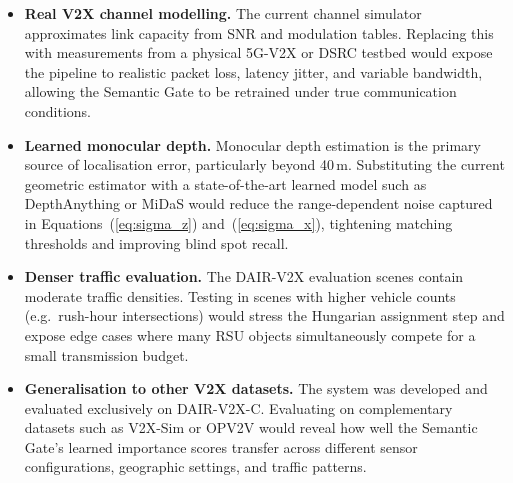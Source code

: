 \documentclass[12pt]{article}
\begin{document}
\begin{itemize}
    \item \textbf{Real V2X channel modelling.}  The current channel
    simulator approximates link capacity from SNR and modulation tables.
    Replacing this with measurements from a physical 5G-V2X or DSRC
    testbed would expose the pipeline to realistic packet loss, latency
    jitter, and variable bandwidth, allowing the Semantic Gate to be
    retrained under true communication conditions.
 
    \item \textbf{Learned monocular depth.}  Monocular depth estimation
    is the primary source of localisation error, particularly beyond
    40\,m.  Substituting the current geometric estimator with a
    state-of-the-art learned model such as DepthAnything or MiDaS would
    reduce the range-dependent noise captured in
    Equations~(\ref{eq:sigma_z}) and~(\ref{eq:sigma_x}), tightening
    matching thresholds and improving blind spot recall.
 
    \item \textbf{Denser traffic evaluation.}  The DAIR-V2X evaluation
    scenes contain moderate traffic densities.  Testing in scenes with
    higher vehicle counts (e.g.\ rush-hour intersections) would stress
    the Hungarian assignment step and expose edge cases where many RSU
    objects simultaneously compete for a small transmission budget.
 
    \item \textbf{Generalisation to other V2X datasets.}  The system
    was developed and evaluated exclusively on DAIR-V2X-C.  Evaluating
    on complementary datasets such as V2X-Sim or OPV2V would reveal
    how well the Semantic Gate's learned importance scores transfer
    across different sensor configurations, geographic settings, and
    traffic patterns.
\end{itemize}
\printbibliography[title={References}]
\end{document}
